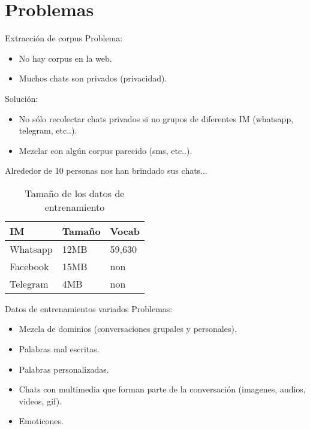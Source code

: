 \documentclass{beamer}
\begin{document}
\section{Problemas}
\begin{frame}{}
	\begin{block}{Extracción de corpus}
    	Problema:
        \begin{itemize}
        	\item No hay corpus en la web.
            \item Muchos chats son privados (privacidad).
        \end{itemize}
        \pause
    	Solución:
    	\begin{itemize}
    		\item No sólo recolectar chats privados si no grupos de diferentes IM (whatsapp, telegram, etc..).
            \item Mezclar con algún corpus parecido (sms, etc..).
    	\end{itemize}
        \pause
        Alrededor de 10 personas nos han brindado sus chats...
        \begin{table}[htbp]
    		\begin{center}
        		\begin{tabular}{|l|l|l|}
        			\hline
        			IM & Tamaño & Vocab \\
        			\hline \hline
        			Whatsapp & 12MB & 59,630\\ \hline
        			Facebook & 15MB & non\\ \hline
        			Telegram & 4MB  & non\\ \hline
        		\end{tabular}
        	\caption{Tamaño de los datos de entrenamiento}
       		\end{center}
    	\end{table}
    \end{block}
\end{frame}

\begin{frame}{Datos de entrenamientos variados}
    Problemas:
	\begin{itemize}
	    \item Mezcla de dominios (conversaciones grupales y personales).
      	\item Palabras mal escritas.
        \item Palabras personalizadas.
        \item Chats con multimedia que forman parte de la conversación (imagenes, audios, videos, gif).
        \item Emoticones.
	\end{itemize}
\end{frame}
\end{document}
